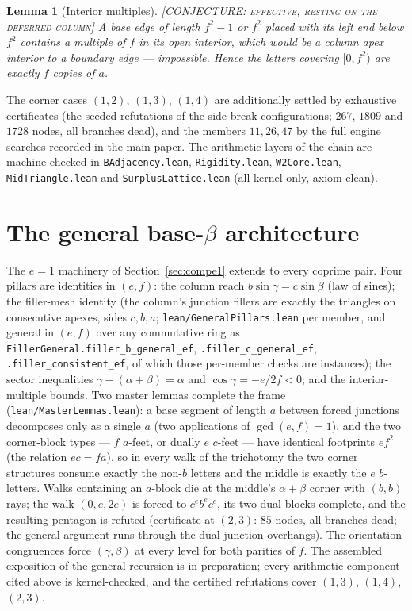 \documentclass[11pt,reqno]{amsart}
\theoremstyle{plain}
\newtheorem{lemma}[theorem]{Lemma}
\theoremstyle{definition}
\newcommand{\lab}[1]{\hfill\textnormal{\footnotesize\textsc{[#1]}}}
\begin{document}
\begin{lemma}[Interior multiples]\label{lem:interior}\lab{CONJECTURE: effective, resting on the deferred column}
A base edge of length $f^2-1$ or $f^2$ placed with its left end below $f^2$ contains a multiple
of $f$ in its open interior, which would be a column apex interior to a boundary edge ---
impossible. Hence the letters covering $[0,f^2)$ are exactly $f$ copies of $a$.
\end{lemma}

The corner cases $(1,2)$, $(1,3)$, $(1,4)$ are additionally settled by exhaustive certificates
(the seeded refutations of the side-break configurations; $267$, $1809$ and $1728$ nodes, all
branches dead), and the members $11,26,47$ by the full engine searches recorded in the main
paper. The arithmetic layers of the chain are machine-checked in
\texttt{BAdjacency.lean}, \texttt{Rigidity.lean}, \texttt{W2Core.lean}, \texttt{MidTriangle.lean}
and \texttt{SurplusLattice.lean} (all kernel-only, axiom-clean).

\section{The general base-$\beta$ architecture}\label{sec:compgeneral}

The $e=1$ machinery of Section~\ref{sec:compe1} extends to every coprime pair. Four pillars are
identities in $(e,f)$: the column reach $b\sin\gamma=c\sin\beta$ (law of sines); the filler-mesh
identity (the column's junction fillers are exactly the triangles on consecutive apexes, sides
$c,b,a$; \texttt{lean/GeneralPillars.lean} per member, and general in $(e,f)$ over any
commutative ring as \texttt{FillerGeneral.filler\_b\_general\_ef},
\texttt{.filler\_c\_general\_ef}, \texttt{.filler\_consistent\_ef}, of which those
per-member checks are instances); the sector inequalities $\gamma-(\alpha+\beta)=\alpha$
and $\cos\gamma=-e/2f<0$; and the interior-multiple bounds. Two master lemmas complete the frame
(\texttt{lean/MasterLemmas.lean}): a base segment of length $a$ between forced junctions
decomposes only as a single $a$ (two applications of $\gcd(e,f)=1$), and the two corner-block
types --- $f$ $a$-feet, or dually $e$ $c$-feet --- have identical footprints $ef^2$ (the relation
$ec=fa$), so in every walk of the trichotomy the two corner structures consume exactly the
non-$b$ letters and the middle is exactly the $e$ $b$-letters. Walks containing an $a$-block die
at the middle's $\alpha+\beta$ corner with $(b,b)$ rays; the walk $(0,e,2e)$ is forced to
$c^e b^e c^e$, its two dual blocks complete, and the resulting pentagon is refuted (certificate at
$(2,3)$: $85$ nodes, all branches dead; the general argument runs through the dual-junction
overhangs). The orientation congruences force $(\gamma,\beta)$ at every level for both parities of
$f$. The assembled exposition of the general recursion is in preparation; every arithmetic
component cited above is kernel-checked, and the certified refutations cover
$(1,3)$, $(1,4)$, $(2,3)$.
\end{document}
